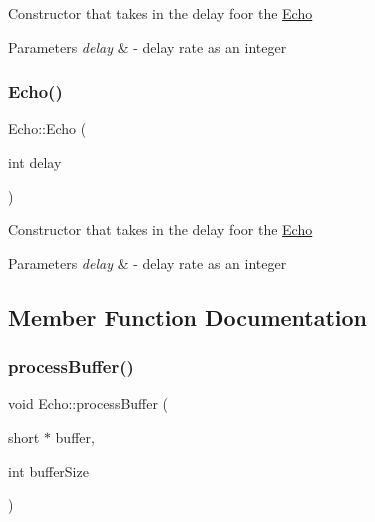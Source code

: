 Constructor that takes in the delay foor the \hyperlink{classEcho}{Echo} 
\begin{DoxyParams}{Parameters}
{\em delay} & -\/ delay rate as an integer \\
\hline
\end{DoxyParams}
\mbox{\label{classEcho_a9531515ffab8be1e38cbdc0e0e9338a6}} 
\subsubsection{\texorpdfstring{Echo()}{Echo()}\hspace{0.1cm}{\footnotesize\ttfamily [2/2]}}
{\footnotesize\ttfamily Echo\+::\+Echo (\begin{DoxyParamCaption}\item[{int}]{delay }\end{DoxyParamCaption})\hspace{0.3cm}{\ttfamily [explicit]}}

Constructor that takes in the delay foor the \hyperlink{classEcho}{Echo} 
\begin{DoxyParams}{Parameters}
{\em delay} & -\/ delay rate as an integer \\
\hline
\end{DoxyParams}


\subsection{Member Function Documentation}
\mbox{\label{classEcho_a18d9d3ec6f9a225810dbe5965e988de9}} 
\subsubsection{\texorpdfstring{process\+Buffer()}{processBuffer()}\hspace{0.1cm}{\footnotesize\ttfamily [1/2]}}
{\footnotesize\ttfamily void Echo\+::process\+Buffer (\begin{DoxyParamCaption}\item[{short $\ast$}]{buffer,  }\item[{int}]{buffer\+Size }\end{DoxyParamCaption})\hspace{0.3cm}{\ttfamily [override]}}

